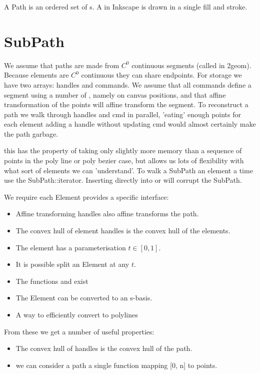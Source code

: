 A Path is an ordered set of s.  A  in
Inkscape is drawn in a single fill and stroke.

\section{SubPath}


We assume that paths are made from $C^0$ continuous segments (called
 in 2geom).  Because elements are $C^0$ continuous
they can share endpoints.  For storage we have two arrays: handles and
commands.  We assume that all commands define a segment using a number
of , namely on canvas positions, and that affine
transformation of the points will affine transform the segment.  To
reconstruct a path we walk through handles and cmd in parallel,
'eating' enough points for each element adding a handle without
updating cmd would almost certainly make the path garbage.

this has the property of taking only slightly more memory than a
sequence of points in the poly line or poly bezier case, but allows us
lots of flexibility with what sort of elements we can 'understand'.
To walk a SubPath an element a time use the SubPath::iterator.
Inserting directly into  or 
will corrupt the SubPath.

We require each Element provides a specific interface:

\begin{itemize}
\item Affine transforming handles also affine transforms the path.
\item The convex hull of element handles is the convex hull of the elements.
\item The element has a parameterisation $t \in [0,1]$.
\item It is possible split an Element at any $t$.
\item The functions  and  exist
\item The Element can be converted to an s-basis.
\item A way to efficiently convert to polylines
\end{itemize}

From these we get a number of useful properties:
\begin{itemize}
\item The convex hull of handles is the convex hull of the path.
\item we can consider a path a single function mapping [0, n] to points.
\end{itemize}

